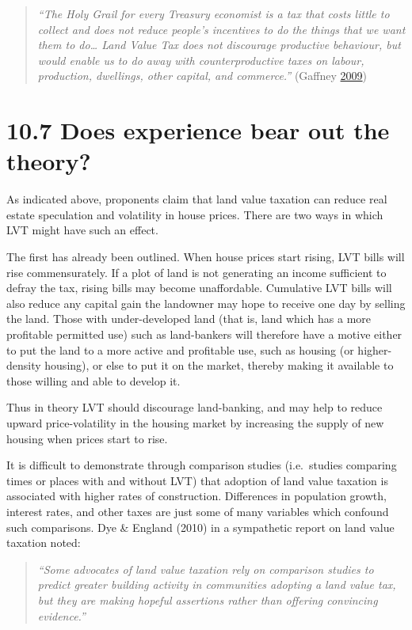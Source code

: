 \documentclass[]{tufte-handout}
\begin{document}
\begin{quote}
\emph{``The Holy Grail for every Treasury economist is a tax that costs
little to collect and does not reduce people's incentives to do the
things that we want them to do\ldots{} Land Value Tax does not
discourage productive behaviour, but would enable us to do away with
counterproductive taxes on labour, production, dwellings, other capital,
and commerce.''} (Gaffney \protect\hyperlink{ref-Gaffney2009}{2009})
\end{quote}

\hypertarget{does-experience-bear-out-the-theory}{%
\section{10.7 Does experience bear out the
theory?}\label{does-experience-bear-out-the-theory}}

As indicated above, proponents claim that land value taxation can reduce
real estate speculation and volatility in house prices. There are two
ways in which LVT might have such an effect.

The first has already been outlined. When house prices start rising, LVT
bills will rise commensurately. If a plot of land is not generating an
income sufficient to defray the tax, rising bills may become
unaffordable. Cumulative LVT bills will also reduce any capital gain the
landowner may hope to receive one day by selling the land. Those with
under-developed land (that is, land which has a more profitable
permitted use) such as land-bankers will therefore have a motive either
to put the land to a more active and profitable use, such as housing (or
higher-density housing), or else to put it on the market, thereby making
it available to those willing and able to develop it.

Thus in theory LVT should discourage land-banking, and may help to
reduce upward price-volatility in the housing market by increasing the
supply of new housing when prices start to rise.

It is difficult to demonstrate through comparison studies (i.e.~studies
comparing times or places with and without LVT) that adoption of land
value taxation is associated with higher rates of construction.
Differences in population growth, interest rates, and other taxes are
just some of many variables which confound such comparisons. Dye \&
England (2010) in a sympathetic report on land value taxation noted:

\begin{quote}
\emph{``Some advocates of land value taxation rely on comparison studies
to predict greater building activity in communities adopting a land
value tax, but they are making hopeful assertions rather than offering
convincing evidence.''}
\end{quote}
\end{document}
